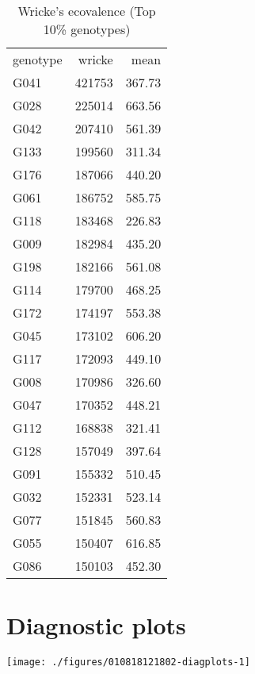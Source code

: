 \documentclass[a4paper,11pt]{article}\usepackage[]{graphicx}\usepackage[]{color}
\makeatletter
\def\maxwidth{ %
  \ifdim\Gin@nat@width>\linewidth
    \linewidth
  \else
    \Gin@nat@width
  \fi
}
\newenvironment{knitrout}{}{} %
\makeatother
\begin{document}
\begin{table}[ht]
\begin{flushleft}
\caption{Wricke's ecovalence (Top 10\% genotypes)} 
\label{wricke}
\begin{tabular}{lrr}
 genotype & wricke & mean \\ 
 G041 & 421753 & 367.73 \\ 
  G028 & 225014 & 663.56 \\ 
  G042 & 207410 & 561.39 \\ 
  G133 & 199560 & 311.34 \\ 
  G176 & 187066 & 440.20 \\ 
  G061 & 186752 & 585.75 \\ 
  G118 & 183468 & 226.83 \\ 
  G009 & 182984 & 435.20 \\ 
  G198 & 182166 & 561.08 \\ 
  G114 & 179700 & 468.25 \\ 
  G172 & 174197 & 553.38 \\ 
  G045 & 173102 & 606.20 \\ 
  G117 & 172093 & 449.10 \\ 
  G008 & 170986 & 326.60 \\ 
  G047 & 170352 & 448.21 \\ 
  G112 & 168838 & 321.41 \\ 
  G128 & 157049 & 397.64 \\ 
  G091 & 155332 & 510.45 \\ 
  G032 & 152331 & 523.14 \\ 
  G077 & 151845 & 560.83 \\ 
  G055 & 150407 & 616.85 \\ 
  G086 & 150103 & 452.30 \\ 
  \end{tabular}
\end{flushleft}
\end{table}


\clearpage
\section{Diagnostic plots}
\begin{knitrout}
\color{fgcolor}

\texttt{[image: ./figures/010818121802-diagplots-1]} \hfill{}



\end{knitrout}

\end{document}
